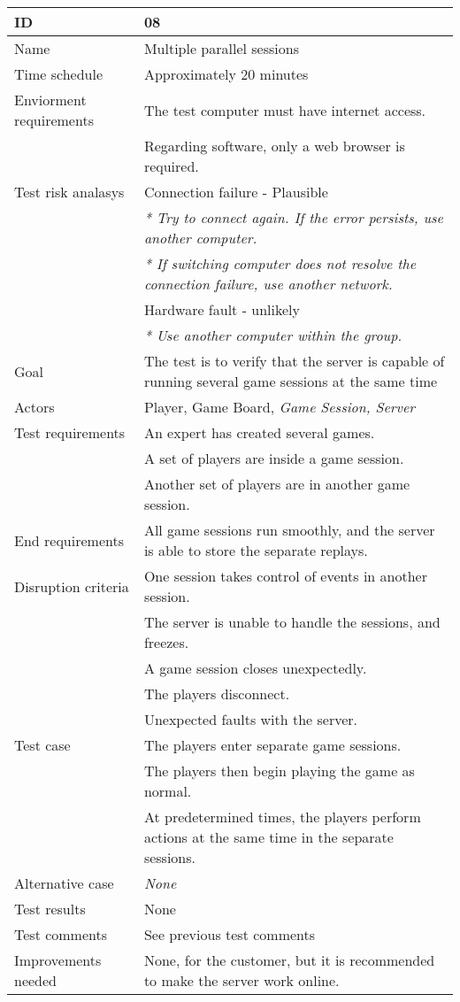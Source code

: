 
{\footnotesize
\begin{table}[H]
\begin{tabular}{| p{5cm} | p{10cm} |}\hline
	\textbf{ID}	& \textbf{08} \\ \hline
	Name		& Multiple parallel sessions\\ \hline
	Time schedule	& Approximately 20 minutes\\ \hline
	Enviorment requirements 
		& The test computer must have internet access. \\
		& Regarding software, only a web browser is required. \\ \hline
	Test risk analasys 
		& Connection failure - Plausible \\
		& \emph{* Try to connect again. If the error persists, use another computer.} \\
		& \emph{* If switching computer does not resolve the connection failure, use another network.}\\
		& Hardware fault - unlikely \\
		& \emph{* Use another computer within the group.} \\ \hline
	Goal	& The test is to verify that the server is capable of running several game sessions at the same time \\ \hline
	Actors	& Player, Game Board, \emph{Game Session, Server} \\ \hline
	Test requirements
		& An expert has created several games.\\
		& A set of players are inside a game session.\\
		& Another set of players are in another game session. \\ \hline
	End requirements 
		& All game sessions run smoothly, and the server is able to store the separate replays.\\ \hline
	Disruption criteria 
		& One session takes control of events in another session.\\
		& The server is unable to handle the sessions, and freezes.\\
		& A game session closes unexpectedly. \\
		& The players disconnect.\\
		& Unexpected faults with the server. \\ \hline
	Test case
		& The players enter separate game sessions.\\
		& The players then begin playing the game as normal.\\
		& At predetermined times, the players perform actions at the same time in the separate sessions.\\ \hline
	Alternative case
		& \emph{None}\\ \hline
	Test results 
		& None \\ \hline
	Test comments
		& See previous test comments \\ \hline
	Improvements needed
		& None, for the customer, but it is recommended to make the server work online. \\ \hline
\end{tabular}



\end{table}}
